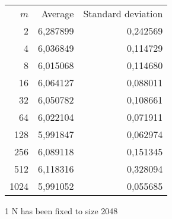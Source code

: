 \begin{tabular}{rrr}\
 $m$ & Average & Standard deviation  \\
2 &  6,287899 &  0,242569 \\ 
4 &  6,036849 &  0,114729 \\ 
8 &  6,015068 &  0,114680 \\ 
16 &  6,064127 &  0,088011 \\ 
32 &  6,050782 &  0,108661 \\ 
64 &  6,022104 &  0,071911 \\ 
128 &  5,991847 &  0,062974 \\ 
256 &  6,089118 &  0,151345 \\ 
512 &  6,118316 &  0,328094 \\ 
1024 &  5,991052 &  0,055685 \\ 
\end{tabular}
\begin{tablenotes}
\item[1] N has been fixed to size 2048
\end{tablenotes}
